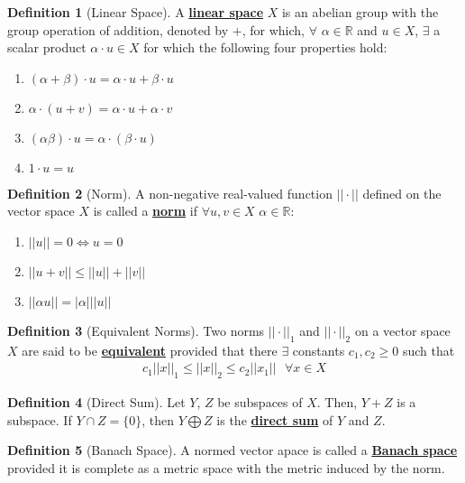 \documentclass[11pt]{article}
\theoremstyle{definition}
\theoremstyle{definition}
\newcommand{\R}[0]{\mathbb{R}}
\newcommand{\dfn}[1]{\underline{\textbf{#1}}}
\theoremstyle{definition}
\newtheorem{definition}{\textcolor{OliveGreen}{Definition}}
\theoremstyle{remark}
\begin{document}
\begin{definition}[Linear Space]
	A \dfn{linear space} $X$ is an abelian group with the group operation of addition, denoted by $+$, for which, $\forall $ $\alpha \in \R$ and $u \in X$, $\exists$ a scalar product $\alpha \cdot u \in X$ for which the following four properties hold: 
	\begin{enumerate}[noitemsep]
		\item $(\alpha + \beta) \cdot u = \alpha \cdot u + \beta \cdot u $
		\item $\alpha \cdot (u+v) = \alpha \cdot u + \alpha \cdot v$ 
		\item $(\alpha \beta) \cdot u = \alpha \cdot ( \beta \cdot u) $
		\item $1 \cdot u =u$
	\end{enumerate}
\end{definition}

\begin{definition}[Norm]
	A non-negative real-valued function $|| \cdot ||$ defined on the vector space $X$ is called a \dfn{norm} if $\forall u, v \in X$ $\alpha \in \R$: 
	\begin{enumerate}[noitemsep]
		\item $|| u || =0 \iff u=0$
		\item $|| u + v || \leq ||u || + ||v||$
		\item $ || \alpha u || = | \alpha | || u || $
	\end{enumerate}
\end{definition}

\begin{definition}[Equivalent Norms]
	Two norms $|| \cdot ||_1$ and $|| \cdot ||_2$ on a vector space $X$ are said to be \dfn{equivalent} provided that there $\exists$ constants $c_1, c_2 \geq 0$ such that 
	\begin{align}
		c_1 || x ||_1 \leq || x ||_2 \leq c_2 || x_1 || \text{ 		} \forall x \in X	
	\end{align}

\end{definition}

\begin{definition}[Direct Sum]
	Let $Y$, $Z$ be subspaces of $X$. Then, $Y+Z$ is a subspace. If $Y \cap Z = \{ 0 \}$, then $Y \bigoplus Z$ is the \dfn{direct sum} of $Y$ and $Z$. 	
\end{definition}

\begin{definition}[Banach Space]
	A normed vector apace is called a \dfn{Banach space} provided it is complete as a metric space with the metric induced by the norm. 
\end{definition}
\end{document}
